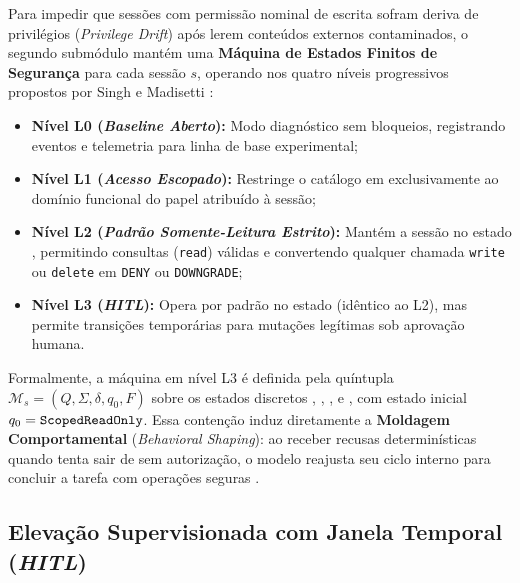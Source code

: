 Para impedir que sessões com permissão nominal de escrita sofram deriva de privilégios (\textit{Privilege Drift}) após lerem conteúdos externos contaminados, o segundo submódulo mantém uma \textbf{Máquina de Estados Finitos de Segurança} para cada sessão $s$, operando nos quatro níveis progressivos propostos por Singh e Madisetti \cite{singh2026mcpsecure}:
\begin{itemize}
  \item \textbf{Nível L0 (\textit{Baseline Aberto}):} Modo diagnóstico sem bloqueios, registrando eventos e telemetria para linha de base experimental;
  \item \textbf{Nível L1 (\textit{Acesso Escopado}):} Restringe o catálogo em  exclusivamente ao domínio funcional do papel atribuído à sessão;
  \item \textbf{Nível L2 (\textit{Padrão Somente-Leitura Estrito}):} Mantém a sessão no estado , permitindo consultas (\texttt{read}) válidas e convertendo qualquer chamada \texttt{write} ou \texttt{delete} em \texttt{DENY} ou \texttt{DOWNGRADE};
  \item \textbf{Nível L3 (\textit{HITL}):} Opera por padrão no estado  (idêntico ao L2), mas permite transições temporárias para mutações legítimas sob aprovação humana.
\end{itemize}

Formalmente, a máquina em nível L3 é definida pela quíntupla $\mathcal{M}_s = (Q, \Sigma, \delta, q_0, F)$ sobre os estados discretos , , ,  e , com estado inicial $q_0 = \text{\texttt{ScopedReadOnly}}$. Essa contenção induz diretamente a \textbf{Moldagem Comportamental} (\textit{Behavioral Shaping}): ao receber recusas determinísticas quando tenta sair de  sem autorização, o modelo reajusta seu ciclo interno para concluir a tarefa com operações seguras \cite{singh2026mcpsecure}.

\subsection{Elevação Supervisionada com Janela Temporal (\textit{HITL})}
\label{subsec:elevacao_hitl}

